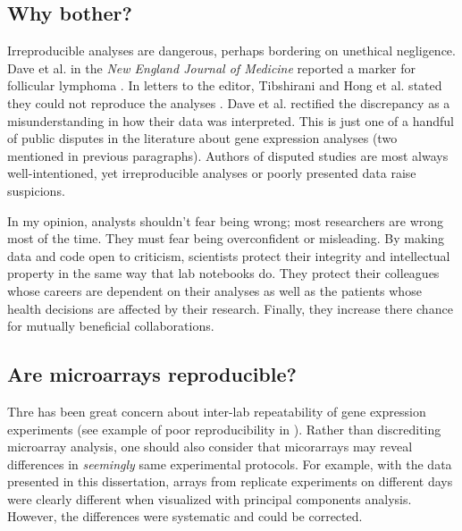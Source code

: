 \subsection{Why bother?}

Irreproducible analyses are dangerous, perhaps bordering on unethical negligence. 
Dave et al. in the \textit{New England
Journal of Medicine} reported a marker for follicular lymphoma \cite{Dave:2004vl}. 
In letters to the editor, Tibshirani and Hong et al. stated they 
could not reproduce the analyses \cite{Tibshirani:2005el}. 
Dave et al. rectified the discrepancy as a misunderstanding
in how their data was interpreted. This is just one of a handful of
public disputes in the literature about gene expression analyses (two mentioned
in previous paragraphs).
Authors of disputed studies are most always well-intentioned, yet 
irreproducible analyses or poorly presented data raise suspicions.

In my opinion, analysts shouldn't fear being wrong; most researchers
are wrong most of the time. They must fear being overconfident or misleading. 
By making data and code open to criticism,
scientists protect their integrity and intellectual property in the same
way that lab notebooks do. They protect their colleagues
whose careers are dependent on their analyses as well as the patients
whose health decisions are affected by their research.
Finally, they increase there chance for mutually beneficial collaborations.

\subsection{Are microarrays reproducible?}

Thre has been great concern about inter-lab repeatability of 
gene expression experiments
(see example of poor reproducibility in 
\cite{Evsikov:2003ic,Fortunel:2003eu,Ivanova:2003bh,RamalhoSantos:2002dy}). 
Rather than discrediting microarray analysis,
one should also consider that micorarrays
may reveal differences in \textit{seemingly} same experimental protocols.
For example, with the data presented in this dissertation, arrays from
replicate experiments on different days were clearly different when
visualized with principal components analysis. However, the differences
were systematic and could be corrected.

